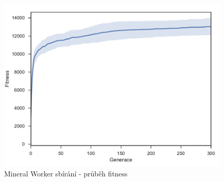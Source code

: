 \begin{figure}[h]\centering
	\includegraphics[width=0.75\columnwidth]{../img/MineralMap/MineralWorkerPickup}
	\caption{Mineral Worker sbírání - průběh fitness}
	\label{obr04:MineralWorkerPickUp}
\end{figure}
\clearpage
